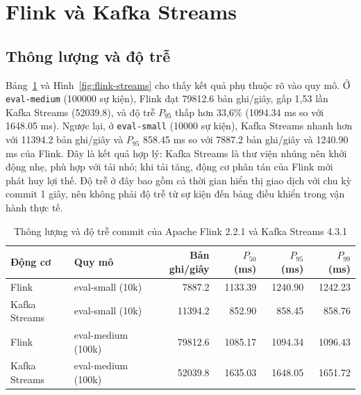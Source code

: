 \section{Flink và Kafka Streams}
\label{sec:c5-flink-vs-streams}

\subsection{Thông lượng và độ trễ}
\label{sec:c5-thong-luong}
Bảng~\ref{tab:flink-streams} và Hình~\ref{fig:flink-streams} cho thấy kết quả phụ thuộc rõ vào quy mô. Ở \texttt{eval-medium} (\num{100000} sự kiện), Flink đạt \num{79812.6} bản ghi/giây, gấp 1,53 lần Kafka Streams (\num{52039.8}), và độ trễ $P_{95}$ thấp hơn 33,6\% (\num{1094.34} ms so với \num{1648.05} ms). Ngược lại, ở \texttt{eval-small} (\num{10000} sự kiện), Kafka Streams nhanh hơn với \num{11394.2} bản ghi/giây và $P_{95}$ \num{858.45} ms so với \num{7887.2} bản ghi/giây và \num{1240.90} ms của Flink. Đây là kết quả hợp lý: Kafka Streams là thư viện nhúng nên khởi động nhẹ, phù hợp với tải nhỏ; khi tải tăng, động cơ phân tán của Flink mới phát huy lợi thế. Độ trễ ở đây bao gồm cả thời gian hiển thị giao dịch với chu kỳ commit 1 giây, nên không phải độ trễ từ sự kiện đến bảng điều khiển trong vận hành thực tế.

\begin{table}[H]
\centering
\caption{Thông lượng và độ trễ commit của Apache Flink 2.2.1 và Kafka Streams 4.3.1}
\label{tab:flink-streams}
\small
\renewcommand{\arraystretch}{1.2}
\begin{tabular}{llrrrr}
\toprule
\textbf{Động cơ} & \textbf{Quy mô} & \textbf{Bản ghi/giây} & \textbf{$P_{50}$ (ms)} & \textbf{$P_{95}$ (ms)} & \textbf{$P_{99}$ (ms)} \\
\midrule
Flink & eval-small (10k) & \num{7887.2} & \num{1133.39} & \num{1240.90} & \num{1242.23} \\
Kafka Streams & eval-small (10k) & \num{11394.2} & \num{852.90} & \num{858.45} & \num{858.76} \\
Flink & eval-medium (100k) & \num{79812.6} & \num{1085.17} & \num{1094.34} & \num{1096.43} \\
Kafka Streams & eval-medium (100k) & \num{52039.8} & \num{1635.03} & \num{1648.05} & \num{1651.72} \\
\bottomrule
\end{tabular}
\end{table}

